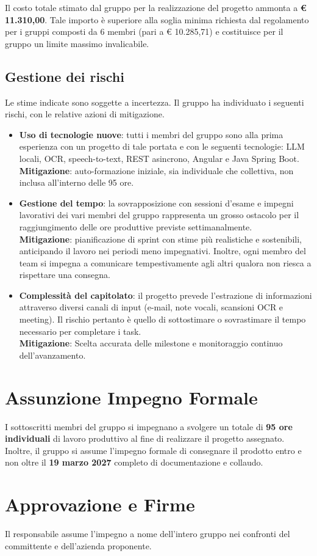 Il costo totale stimato dal gruppo {\nomegruppo} per la realizzazione del progetto ammonta a \textbf{€ 11.310,00}.   Tale importo è superiore alla soglia minima richiesta dal regolamento per i gruppi composti da 6 membri (pari a € 10.285,71) e costituisce per il gruppo un limite massimo invalicabile.

\subsection{Gestione dei rischi}
Le stime indicate sono soggette a incertezza. Il gruppo ha individuato i seguenti rischi, con le relative azioni di mitigazione.
\begin{itemize}
	\item\textbf{Uso di tecnologie nuove}: tutti i membri del gruppo sono alla prima esperienza con un progetto di tale portata e con le seguenti tecnologie:    LLM locali, OCR, speech-to-text, REST asincrono, Angular e Java Spring Boot.\\
	 \textbf{Mitigazione}: auto-formazione iniziale, sia individuale che collettiva, non inclusa all'interno delle 95 ore.
	 \item \textbf{Gestione del tempo}: la sovrapposizione con sessioni d'esame e impegni lavorativi dei vari membri del gruppo rappresenta un grosso ostacolo per il raggiungimento delle ore produttive previste settimanalmente. \\
	 \textbf{Mitigazione}: pianificazione di sprint con stime più realistiche e sostenibili, anticipando il lavoro nei periodi meno impegnativi. Inoltre, ogni membro del team si impegna a comunicare tempestivamente agli altri qualora non riesca a rispettare una consegna.
	 \item \textbf{Complessità del capitolato}: il progetto prevede l'estrazione di informazioni attraverso diversi canali di input (e-mail, note vocali, scansioni OCR e meeting). Il rischio pertanto è quello di sottostimare o sovrastimare il tempo necessario per completare i task.\\
	 \textbf{Mitigazione}: Scelta accurata delle milestone e monitoraggio continuo dell'avanzamento.
\end{itemize}

\section{Assunzione Impegno Formale}
I sottoscritti membri del gruppo {\nomegruppo} si impegnano a svolgere un totale di \textbf{95 ore individuali} di lavoro produttivo al fine di realizzare il progetto assegnato. Inoltre, il gruppo si assume l'impegno formale di consegnare il prodotto entro e non oltre il \textbf{19 marzo 2027} completo di documentazione e collaudo. 

\section{Approvazione e Firme}
Il responsabile assume l'impegno a nome dell'intero gruppo nei confronti del committente e dell'azienda proponente.
\vspace{2em}
\newline
\vspace{2em}
\noindent
\noindent\hfill{}
